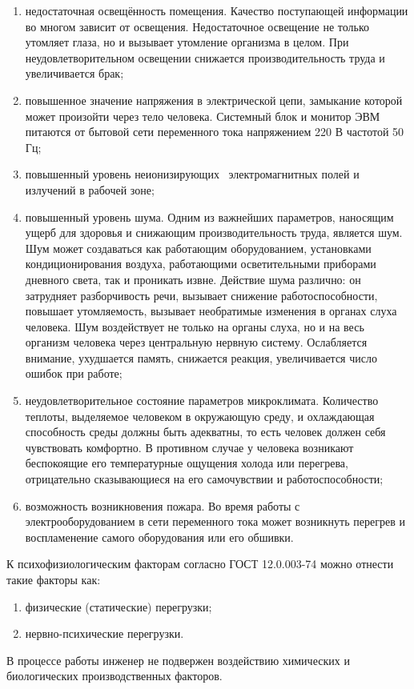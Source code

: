 \begin{enumerate}
\item недостаточная освещённость помещения. Качество поступающей информации во многом зависит от освещения. Недостаточное освещение не только утомляет глаза, но и вызывает утомление организма в целом. При неудовлетворительном освещении снижается производительность труда и увеличивается брак;
\item повышенное значение напряжения в электрической цепи, замыкание которой может произойти через тело человека. Системный блок и монитор ЭВМ питаются от бытовой сети переменного тока напряжением 220 В частотой 50 Гц;
\item повышенный уровень неионизирующих \ электромагнитных полей и излучений в рабочей зоне;
\item повышенный уровень шума. Одним из важнейших параметров, наносящим ущерб для здоровья и снижающим производительность труда, является шум. Шум может создаваться как работающим оборудованием, установками кондиционирования воздуха, работающими осветительными приборами дневного света, так и проникать извне. Действие шума различно: он затрудняет разборчивость речи, вызывает снижение работоспособности, повышает утомляемость, вызывает необратимые изменения в органах слуха человека. Шум воздействует не только на органы слуха, но и на весь организм человека через центральную нервную систему. Ослабляется внимание, ухудшается память, снижается реакция, увеличивается число ошибок при работе;
\item неудовлетворительное состояние параметров микроклимата. Количество теплоты, выделяемое человеком в окружающую среду, и охлаждающая способность среды должны быть адекватны, то есть человек должен себя чувствовать комфортно. В противном случае у человека возникают беспокоящие его температурные ощущения холода или перегрева, отрицательно сказывающиеся на его самочувствии и работоспособности;
\item возможность возникновения пожара. Во время работы с электрооборудованием в сети переменного тока может возникнуть перегрев и воспламенение самого оборудования или его обшивки.
\end{enumerate}
К психофизиологическим факторам согласно ГОСТ 12.0.003-74 можно отнести такие факторы как:

\begin{enumerate}
\item физические (статические) перегрузки;
\item нервно-психические перегрузки.
\end{enumerate}
В процессе работы инженер не подвержен воздействию химических и биологических производственных факторов.

